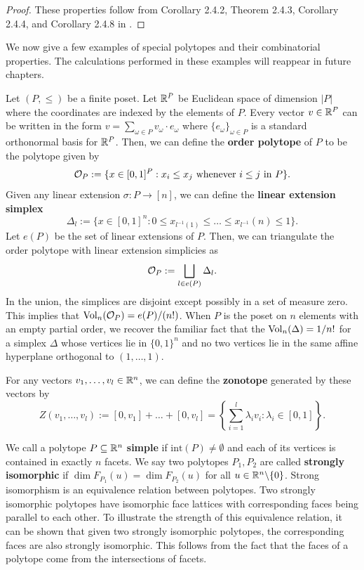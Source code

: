 \documentclass{puthesis-UG}
\begin{document}
\begin{proof}
	These properties follow from Corollary 2.4.2, Theorem 2.4.3, Corollary 2.4.4, and Corollary 2.4.8 in \cite{schneider_2013}. 
\end{proof}

We now give a few examples of special polytopes and their combinatorial properties. The calculations performed in these examples will reappear in future chapters. 

\begin{example}
	Let $(P, \leq)$ be a finite poset. Let $\mathbb{R}^P$ be Euclidean space of dimension $|P|$ where the coordinates are indexed by the elements of $P$. Every vector $v \in \mathbb{R}^P$ can be written in the form $v = \sum_{\omega \in P} v_\omega \cdot e_\omega$ where $\{e_\omega\}_{\omega \in P}$ is a standard orthonormal basis for $\mathbb{R}^P$. Then, we can define the \textbf{order polytope} of $P$ to be the polytope given by
	\[
		\mathcal{O}_P := \{x \in [0, 1]^P : x_{i} \leq x_{j} \text{ whenever } i \leq j \text{ in } P\}.
	\]
	Given any linear extension $\sigma : P \to [n]$, we can define the \textbf{linear extension simplex}
	\[
		\Delta_l := \{x \in [0, 1]^n : 0 \leq x_{l^{-1}(1)} \leq \ldots \leq x_{l^{-1}}(n) \leq 1\}.
	\]
	Let $e(P)$ be the set of linear extensions of $P$. Then, we can triangulate the order polytope with linear extension simplicies as
	\[
		\mathcal{O}_P := \bigsqcup_{l \in e(P)} \Delta_l.
	\]
	In the union, the simplices are disjoint except possibly in a set of measure zero. This implies that $\operatorname{Vol}_n(\mathcal{O}_P) = e(P) / (n!)$. When $P$ is the poset on $n$ elements with an empty partial order, we recover the familiar fact that the $\operatorname{Vol}_n(\Delta) = 1/n!$ for a simplex $\Delta$ whose vertices lie in $\{0, 1\}^n$ and no two vertices lie in the same affine hyperplane orthogonal to $(1, \ldots, 1)$.  
\end{example}

\begin{example}[Zonotope] \label{zonotope-example}
	For any vectors $v_1, \ldots, v_l \in \mathbb{R}^n$, we can define the \textbf{zonotope} generated by these vectors by 
	\[
		Z(v_1, \ldots, v_l) := [0, v_1] + \ldots + [0, v_l] = \left \{ \sum_{i = 1}^l \lambda_i v_i : \lambda_i \in [0, 1] \right \}.
	\]
\end{example}
We call a polytope $P \subseteq \mathbb{R}^n$ \textbf{simple} if $\text{int} (P) \neq \emptyset$ and each of its vertices is contained in exactly $n$ facets. We say two polytopes $P_1, P_2$ are called \textbf{strongly isomorphic} if $\dim F_{P_1}(u) = \dim F_{P_2}(u)$ for all $u \in \mathbb{R}^n \backslash \{0\}$. Strong isomorphism is an equivalence relation between polytopes. Two strongly isomorphic polytopes have isomorphic face lattices with corresponding faces being parallel to each other. To illustrate the strength of this equivalence relation, it can be shown that given two strongly isomorphic polytopes, the corresponding faces are also strongly isomorphic. This follows from the fact that the faces of a polytope come from the intersections of facets. 
\end{document}
